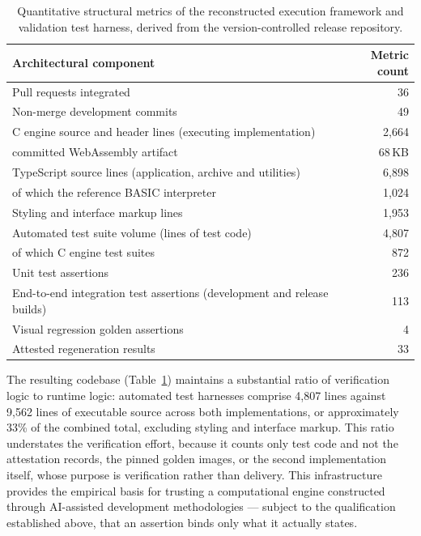 \documentclass[3p,times,authoryear,twocolumn]{elsarticle}
\begin{document}
\begin{table}[tb]
\centering\small
\begin{tabularx}{\linewidth}{@{}Xr@{}}
\toprule
Architectural component & Metric count \\
\midrule
Pull requests integrated & 36 \\
Non-merge development commits & 49 \\
C engine source and header lines (executing implementation) & 2{,}664 \\
\quad committed WebAssembly artifact & 68\,KB \\
TypeScript source lines (application, archive and utilities) & 6{,}898 \\
\quad of which the reference BASIC interpreter & 1{,}024 \\
Styling and interface markup lines & 1{,}953 \\
Automated test suite volume (lines of test code) & 4{,}807 \\
\quad of which C engine test suites & 872 \\
Unit test assertions & 236 \\
End-to-end integration test assertions (development and release builds) & 113 \\
Visual regression golden assertions & 4 \\
Attested regeneration results & 33 \\
\bottomrule
\end{tabularx}
\caption{Quantitative structural metrics of the reconstructed execution framework and validation test harness, derived from the version-controlled release repository.}
\label{tab:llm}
\end{table}

The resulting codebase (Table~\ref{tab:llm}) maintains a substantial ratio of verification logic to runtime logic: automated test harnesses comprise 4{,}807 lines against 9{,}562 lines of executable source across both implementations, or approximately 33\% of the combined total, excluding styling and interface markup. This ratio understates the verification effort, because it counts only test code and not the attestation records, the pinned golden images, or the second implementation itself, whose purpose is verification rather than delivery. This infrastructure provides the empirical basis for trusting a computational engine constructed through AI-assisted development methodologies --- subject to the qualification established above, that an assertion binds only what it actually states.
\end{document}

